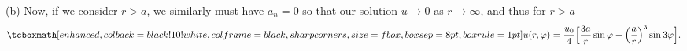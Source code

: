 {(b) Now, if we consider $r > a$, we similarly must have $a_{n} = 0$ so that our solution $u \rightarrow 0$ as $r \rightarrow \infty$, and thus for $r > a$
\begin{eqnarray}
    \eqbox{ u(r,\varphi) = \frac{u_0}{4} \Big[ \frac{3a}{r} \sin{\varphi} - \Big( \frac{a}{r} \Big)^3 \sin{3 \varphi} \Big] }
.\end{eqnarray}

}




